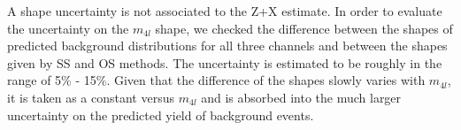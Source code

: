 A shape uncertainty is not associated to the Z+X estimate.
In order to evaluate the uncertainty on the $m_{4l}$ shape, we checked 
the difference between the shapes of predicted background distributions for all three channels and between the shapes given by SS and OS methods. 
The uncertainty is estimated to be roughly in the range of 5\% - 15\%. 
Given that the difference of the shapes slowly varies with $m_{4l}$, it is taken as a constant versus $m_{4l}$ 
and is absorbed into the much larger uncertainty on the predicted yield of background events. 

